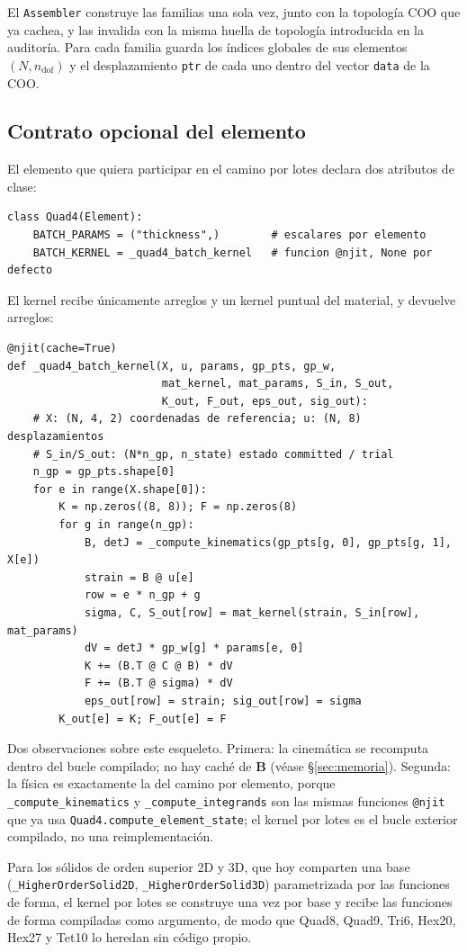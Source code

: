 \documentclass[11pt,letterpaper,oneside]{article}
\newcommand{\code}[1]{\texttt{#1}}
\begin{document}
El \code{Assembler} construye las familias una sola vez, junto con la topología COO que ya cachea, y las invalida con la misma huella de topología introducida en la auditoría. Para cada familia guarda los índices globales de sus elementos $(N, n_{\text{dof}})$ y el desplazamiento \code{ptr} de cada uno dentro del vector \code{data} de la COO.

\subsection{Contrato opcional del elemento}

El elemento que quiera participar en el camino por lotes declara dos atributos de clase:
\begin{lstlisting}
class Quad4(Element):
    BATCH_PARAMS = ("thickness",)        # escalares por elemento
    BATCH_KERNEL = _quad4_batch_kernel   # funcion @njit, None por defecto
\end{lstlisting}
El kernel recibe únicamente arreglos y un kernel puntual del material, y devuelve arreglos:
\begin{lstlisting}
@njit(cache=True)
def _quad4_batch_kernel(X, u, params, gp_pts, gp_w,
                        mat_kernel, mat_params, S_in, S_out,
                        K_out, F_out, eps_out, sig_out):
    # X: (N, 4, 2) coordenadas de referencia; u: (N, 8) desplazamientos
    # S_in/S_out: (N*n_gp, n_state) estado committed / trial
    n_gp = gp_pts.shape[0]
    for e in range(X.shape[0]):
        K = np.zeros((8, 8)); F = np.zeros(8)
        for g in range(n_gp):
            B, detJ = _compute_kinematics(gp_pts[g, 0], gp_pts[g, 1], X[e])
            strain = B @ u[e]
            row = e * n_gp + g
            sigma, C, S_out[row] = mat_kernel(strain, S_in[row], mat_params)
            dV = detJ * gp_w[g] * params[e, 0]
            K += (B.T @ C @ B) * dV
            F += (B.T @ sigma) * dV
            eps_out[row] = strain; sig_out[row] = sigma
        K_out[e] = K; F_out[e] = F
\end{lstlisting}
Dos observaciones sobre este esqueleto. Primera: la cinemática se recomputa dentro del bucle compilado; no hay caché de $\mathbf B$ (véase §\ref{sec:memoria}). Segunda: la física es exactamente la del camino por elemento, porque \code{\_compute\_kinematics} y \code{\_compute\_integrands} son las mismas funciones \code{@njit} que ya usa \code{Quad4.compute\_element\_state}; el kernel por lotes es el bucle exterior compilado, no una reimplementación.

Para los sólidos de orden superior 2D y 3D, que hoy comparten una base (\code{\_HigherOrderSolid2D}, \code{\_HigherOrderSolid3D}) parametrizada por las funciones de forma, el kernel por lotes se construye una vez por base y recibe las funciones de forma compiladas como argumento, de modo que Quad8, Quad9, Tri6, Hex20, Hex27 y Tet10 lo heredan sin código propio.
\end{document}
